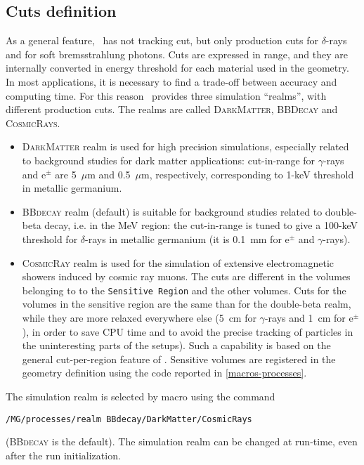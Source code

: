 \subsection{Cuts definition}
As a general feature, \geant\ has not tracking cut, but only production cuts for 
$\delta$-rays and for soft bremsstrahlung photons. Cuts are expressed in range, and they are 
internally converted in energy threshold for each material used in the geometry. \\
In most applications, it is necessary to find a trade-off between accuracy and computing time. For this 
reason \mage\ provides three simulation ``realms'', with different production cuts. The realms 
are called \textsc{DarkMatter}, \textsc{BBDecay} and \textsc{CosmicRays}. \\ 
\begin{itemize}
\item \textsc{DarkMatter} realm is used for high precision simulations, especially related to background 
studies for dark matter applications: cut-in-range for $\gamma$-rays and e$^{\pm}$ are 5~$\mu$m and 
0.5~$\mu$m, respectively, corresponding to 1-keV threshold in metallic germanium. 
\item \textsc{BBdecay}  realm (default) is suitable for background studies related to double-beta 
decay, i.e. in the MeV region: the cut-in-range is tuned to give a 100-keV threshold for $\delta$-rays 
in metallic germanium (it is 0.1~mm for e$^{\pm}$ and $\gamma$-rays). 
\item  \textsc{CosmicRay} realm is used for the simulation of extensive electromagnetic showers 
induced by cosmic ray muons. The cuts are different in the volumes belonging to to the 
\texttt{Sensitive Region} and the other volumes. Cuts for the volumes in the sensitive region are the 
same than for the double-beta realm, while they are more relaxed everywhere else (5~cm for 
$\gamma$-rays and 1~cm for e$^{\pm}$), in order to save CPU time  and to avoid the precise tracking 
of particles in the uninteresting parts of the setups). Such a capability is based on the general 
cut-per-region feature of \geant. Sensitive volumes are registered in the geometry definition using the 
code reported in \ref{macros-processes}. 
\end{itemize}
The simulation realm is selected by macro using the command 
\begin{lstlisting}
/MG/processes/realm BBdecay/DarkMatter/CosmicRays
\end{lstlisting}
(\textsc{BBdecay} is the default). The 
simulation realm can be changed at run-time, even after the run initialization. 
